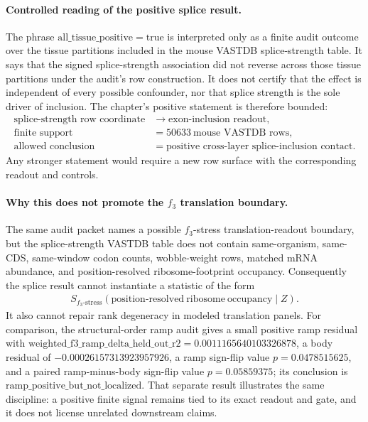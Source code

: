 \paragraph{Controlled reading of the positive splice result.}
The phrase $\mathrm{all\_tissue\_positive}=\mathrm{true}$ is interpreted only as a finite audit outcome over the tissue partitions included in the mouse VASTDB splice-strength table.  It says that the signed splice-strength association did not reverse across those tissue partitions under the audit's row construction.  It does not certify that the effect is independent of every possible confounder, nor that splice strength is the sole driver of inclusion.  The chapter's positive statement is therefore bounded:
$$
\begin{aligned}
\text{splice-strength row coordinate} &\longrightarrow \text{exon-inclusion readout},\\
\text{finite support} &= 50633\ \text{mouse VASTDB rows},\\
\text{allowed conclusion} &= \text{positive cross-layer splice-inclusion contact}.
\end{aligned}
$$
Any stronger statement would require a new row surface with the corresponding readout and controls.

\paragraph{Why this does not promote the $f_3$ translation boundary.}
The same audit packet names a possible $f_3$-stress translation-readout boundary, but the splice-strength VASTDB table does not contain same-organism, same-CDS, same-window codon counts, wobble-weight rows, matched mRNA abundance, and position-resolved ribosome-footprint occupancy.  Consequently the splice result cannot instantiate a statistic of the form
$$
\begin{aligned}
S_{f_3\text{-stress}}(\mathrm{position\mbox{-}resolved\ ribosome\ occupancy}\mid Z).
\end{aligned}
$$
It also cannot repair rank degeneracy in modeled translation panels.  For comparison, the structural-order ramp audit gives a small positive ramp residual with $\mathrm{weighted\_f3\_ramp\_delta\_held\_out\_r2}=0.0011165640103326878$, a body residual of $-0.00026157313923957926$, a ramp sign-flip value $p=0.0478515625$, and a paired ramp-minus-body sign-flip value $p=0.05859375$; its conclusion is $\mathrm{ramp\_positive\_but\_not\_localized}$.  That separate result illustrates the same discipline: a positive finite signal remains tied to its exact readout and gate, and it does not license unrelated downstream claims.

